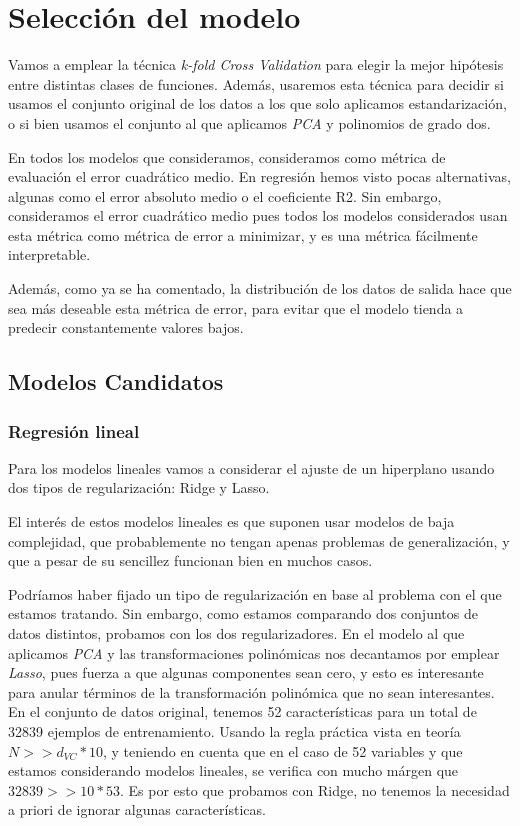 \documentclass[11pt]{article}
\begin{document}
\pagebreak

\section{Selección del modelo} \label{seleccion_modelos} \label{metrica_error}

Vamos a emplear la técnica \emph{k-fold Cross Validation} para elegir la mejor hipótesis entre distintas clases de funciones. Además, usaremos esta técnica para decidir si usamos el conjunto original de los datos a los que solo aplicamos estandarización, o si bien usamos el conjunto al que aplicamos \emph{PCA} y polinomios de grado dos.

En todos los modelos que consideramos, consideramos como métrica de evaluación el error cuadrático medio. En regresión hemos visto pocas alternativas, algunas como el error absoluto medio o el coeficiente R2. Sin embargo, consideramos el error cuadrático medio pues todos los modelos considerados usan esta métrica como métrica de error a minimizar, y es una métrica fácilmente interpretable.

Además, como ya se ha comentado, la distribución de los datos de salida hace que sea más deseable esta métrica de error, para evitar que el modelo tienda a predecir constantemente valores bajos.

\subsection{Modelos Candidatos}

\subsubsection{Regresión lineal} \label{regresion_lineal}

Para los modelos lineales vamos a considerar el ajuste de un hiperplano usando dos tipos de regularización: Ridge y Lasso.

El interés de estos modelos lineales es que suponen usar modelos de baja complejidad, que probablemente no tengan apenas problemas de generalización, y que a pesar de su sencillez funcionan bien en muchos casos.

Podríamos haber fijado un tipo de regularización en base al problema con el que estamos tratando. Sin embargo, como estamos comparando dos conjuntos de datos distintos, probamos con los dos regularizadores. En el modelo al que aplicamos \emph{PCA} y las transformaciones polinómicas nos decantamos por emplear \emph{Lasso}, pues fuerza a que algunas componentes sean cero, y esto es interesante para anular términos de la transformación polinómica que no sean interesantes. En el conjunto de datos original, tenemos 52 características para un total de 32839 ejemplos de entrenamiento. Usando la regla práctica vista en teoría $N >> d_{VC} * 10$, y teniendo en cuenta que en el caso de 52 variables y que estamos considerando modelos lineales, se verifica con mucho márgen que $32839 >> 10 * 53$. Es por esto que probamos con Ridge, no tenemos la necesidad a priori de ignorar algunas características.
\end{document}
